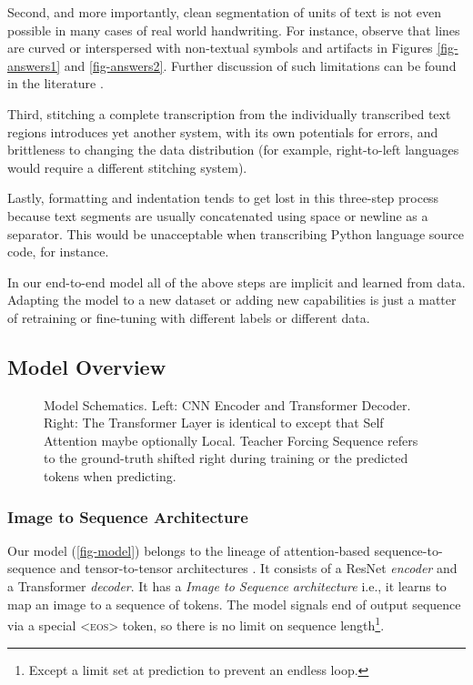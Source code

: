 \documentclass[runningheads]{llncs}
\begin{document}
Second, and more importantly, clean segmentation of units of text is not even possible in many cases of real world handwriting.
For instance, observe that lines are curved or interspersed with non-textual symbols and artifacts in Figures \ref{fig-answers1} and \ref{fig-answers2}.
Further discussion of such limitations can be found in the literature \citep{Bluche2016JointLS,DBLP:journals/corr/BlucheLM16}.

Third, stitching a complete transcription from the individually transcribed text regions introduces yet another system, with its own potentials for errors, and brittleness to changing the data distribution (for example, right-to-left languages would require a different stitching system).

Lastly, formatting and indentation tends to get lost in this three-step process because text segments are usually concatenated using space or newline as a separator.
This would be unacceptable when transcribing Python language source code, for instance.

In our end-to-end model all of the above steps are implicit and learned from data.
Adapting the model to a new dataset or adding new capabilities is just a matter of retraining or fine-tuning with different labels or different data.

\subsection{Model Overview}

\begin{figure}
\centering
    \hfill
\caption{\small Model Schematics. Left: CNN Encoder and Transformer Decoder. Right: The Transformer Layer is identical to \citep{DBLP:journals/corr/VaswaniSPUJGKP17} except that Self Attention maybe optionally Local.
         Teacher Forcing Sequence refers to the ground-truth shifted right during training or the predicted tokens when predicting.}
\label{fig-model}
\end{figure}

\subsubsection{Image to Sequence Architecture}
Our model (\autoref{fig-model}) belongs to the lineage of attention-based sequence-to-sequence and tensor-to-tensor architectures \citep{Xu2015ShowAA,DBLP:journals/corr/abs-1803-07416}.
It consists of a ResNet \citep{DBLP:journals/corr/HeZRS15} \emph{encoder} and a Transformer \citep{DBLP:journals/corr/VaswaniSPUJGKP17} \emph{decoder}. It has a \emph{Image to Sequence architecture} i.e., it learns to map an image to a sequence of tokens.
The model signals end of output sequence via a special \textsc{\textless{eos\textgreater}} token, so there is no limit on sequence length\footnote{Except a limit set at prediction to prevent an endless loop.}.
\end{document}
